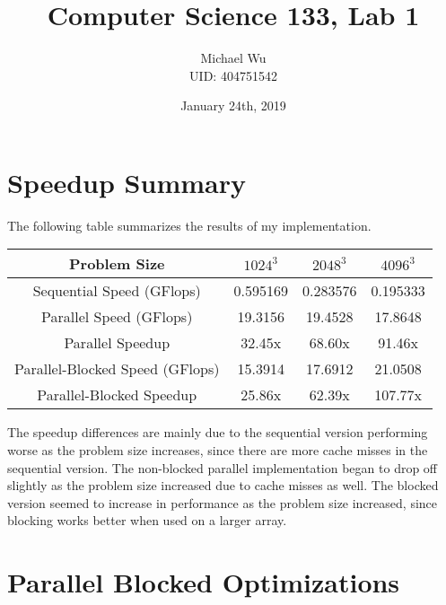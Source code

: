 \documentclass[12pt]{article}
\begin{document}
\title{Computer Science 133, Lab 1}
\date{January 24th, 2019}
\author{Michael Wu\\UID: 404751542}
\maketitle

\section{Speedup Summary}

The following table summarizes the results of my implementation.
\begin{center}
    \begin{tabular}{c|c|c|c}
        Problem Size & \(1024^3\) & \(2048^3\) & \(4096^3\)\\
        \hline
        Sequential Speed (GFlops) & 0.595169 & 0.283576 & 0.195333\\
        Parallel Speed (GFlops) & 19.3156 & 19.4528 & 17.8648\\
        Parallel Speedup & 32.45x & 68.60x & 91.46x\\
        Parallel-Blocked Speed (GFlops)& 15.3914 & 17.6912 & 21.0508\\
        Parallel-Blocked Speedup & 25.86x & 62.39x & 107.77x
    \end{tabular}
\end{center}
The speedup differences are mainly due to the sequential version performing
worse as the problem size increases, since there are more cache misses in the
sequential version. The non-blocked parallel implementation began to drop
off slightly as the problem size increased due to cache misses as well. The
blocked version seemed to increase in performance as the problem size increased,
since blocking works better when used on a larger array.

\section{Parallel Blocked Optimizations}
\end{document}
